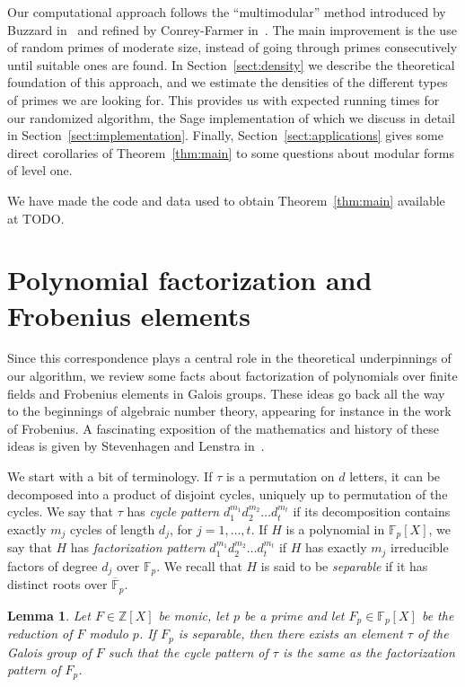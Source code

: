 \documentclass[11pt]{article}
\theoremstyle{plain}
\newtheorem{lemma}[theorem]{Lemma}
\theoremstyle{definition}
\theoremstyle{remark}
\numberwithin{equation}{section}
\newcommand{\ZZ}{\mathbb{Z}}
\newcommand{\FF}{\mathbb{F}}
\begin{document}
Our computational approach follows the ``multimodular'' method introduced by
Buzzard in~\cite{Buzzard} and refined by Conrey-Farmer in~\cite{ConreyFarmer}.
The main improvement is the use of random primes of moderate size, instead of
going through primes consecutively until suitable ones are found.  In
Section~\ref{sect:density} we describe the theoretical foundation of this
approach, and we estimate the densities of the different types of primes we
are looking for.  This provides us with expected running times for our
randomized algorithm, the Sage implementation of which we discuss in detail in
Section~\ref{sect:implementation}.  Finally, Section~\ref{sect:applications}
gives some direct corollaries of Theorem~\ref{thm:main} to some questions
about modular forms of level one.

We have made the code and data used to obtain Theorem~\ref{thm:main} available
at TODO.

\section{Polynomial factorization and Frobenius elements}
\label{sect:frobenius}
Since this correspondence plays a central role in the theoretical
underpinnings of our algorithm, we review some facts about factorization of
polynomials over finite fields and Frobenius elements in Galois groups.  These
ideas go back all the way to the beginnings of algebraic number theory,
appearing for instance in the work of Frobenius.  A fascinating exposition of the
mathematics and history of these ideas is given by Stevenhagen and Lenstra
in~\cite{StevenhagenLenstra}.

We start with a bit of terminology.  If $\tau$ is a permutation on $d$ letters, 
it can be decomposed into a product of disjoint cycles, uniquely up to
permutation of the cycles.  We say that $\tau$ has \emph{cycle pattern}
$d_1^{m_1}d_2^{m_2}\ldots d_t^{m_t}$ if its decomposition contains exactly
$m_j$ cycles of length $d_j$, for $j=1,\ldots,t$.  If $H$ is a polynomial in
$\FF_p[X]$, we say that $H$ has \emph{factorization pattern}
$d_1^{m_1}d_2^{m_2}\ldots d_t^{m_t}$ if $H$ has exactly $m_j$ irreducible
factors of degree $d_j$ over $\FF_p$.  We recall that $H$ is said to be
\emph{separable} if it has distinct roots over $\overline{\FF}_p$.

\begin{lemma}
  \label{lem:frobenius}
  Let $F\in\ZZ[X]$ be monic, let $p$ be a prime and let $F_p\in\FF_p[X]$ be
  the reduction of $F$ modulo $p$.  If $F_p$ is separable, then there exists
  an element $\tau$ of the Galois group of $F$ such that the cycle pattern of
  $\tau$ is the same as the factorization pattern of $F_p$.
\end{lemma}
\end{document}
